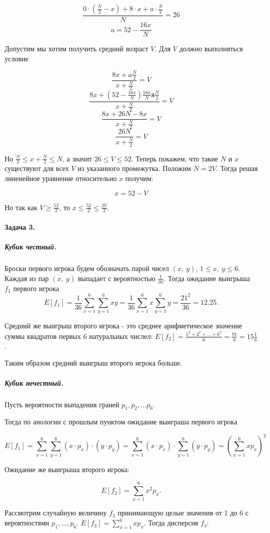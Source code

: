 \documentclass{article}
\newcommand{\pair}[2]{(#1,\ #2)}
\newcommand{\half}[1]{\frac{#1}{2}}
\begin{document}
    $$ \frac{0 \cdot (\half{N} - x) + 8 \cdot x + a \cdot \half{N}}{N} = 26 $$
    $$ a =  52 - \frac{16x}{N}$$

    Допустим мы хотим получить средний возраст $V$. Для $V$ должно выполняться условие

    $$ \frac{8x + a\half{N}} {x + \frac{N}{2}} = V $$
    $$ \frac{8x + (52 - \frac{16x}{N})\frac{16x}{N}я\half{N}} {x + \frac{N}{2}} = V $$ 
    $$ \frac{8x + 26N - 8x} {x + \frac{N}{2}} = V $$
    $$ \frac{26N} {x + \frac{N}{2}} = V $$

    Но $\half{N} \le x + \frac{N}{2} \le N$, а значит $26 \le V \le 52$. Теперь покажем, что такие $N$ и $x$ существуют для всех $V$ из указанного промежутка. Положим $N = 2V$. Тогда решая линенейное уравнение относительно $x$ получим:

    $$ x = 52 - V$$

    Но так как $V \ge \half{52}$, то $x \le \half{52} \le \half{2V}$.

    \paragraph{Задача 3.}
    \subparagraph{Кубик честный.}
    Броски первого игрока будем обозначать парой чисел $(x,\ y)$, $1 \le x,\ y \le 6$. Каждая из пар $\pair{x}{y}$ выпадает с вероятностью $\frac{1}{36}$. Тогда ожидание выигрыша $f_1$ первого игрока 
    $$E[f_1] = \frac{1}{36}\sum_{x=1}^{6}\sum_{y=1}^{6} xy = \frac{1}{36} \sum_{x=1}^{6} x \sum_{y=1}^{6} y = \frac{21^2}{36} = 12.25.$$

    Средний же выигрыш второго игрока - это среднее арифметическое значение суммы квадратов первых 6 натуральных числел: $E[f_2] = \frac{1^2 + 2^2 + \ldots + 6^2}{6} = \frac{91}{6} = 15\frac{1}{6}$.

    Таким образом средний выигрыш второго игрока больше.

    \subparagraph{Кубик нечестный.}
    Пусть вероятности выпадения граней $p_1, p_2, \ldots p_6$.

    Тогда по анологии с прошлым пунктом ожидание выиграша первого игрока 

    $$E[f_1] = \sum_{x=1}^{6}\sum_{y=1}^{6} (x \cdot p_x) \cdot (y \cdot p_y) = 
    \sum_{x=1}^{6} (x \cdot p_x) \cdot \sum_{y=1}^{6} (y \cdot p_y) = (\sum_{x=1}^{6} xp_x)^2$$

    Ожидание же выигрыша второго игрока:

    $$E[f_2] = \sum_{x=1}^{6} x^2p_x.$$

    Рассмотрим случайную величину $f_3$ принимающую целые значения от 1 до 6 с вероятностями $p_1, \ldots, p_6$. $E[f_3] = \sum_{x=1}^{6} xp_x$. Тогда дисперсия $f_3$: 
\end{document}
